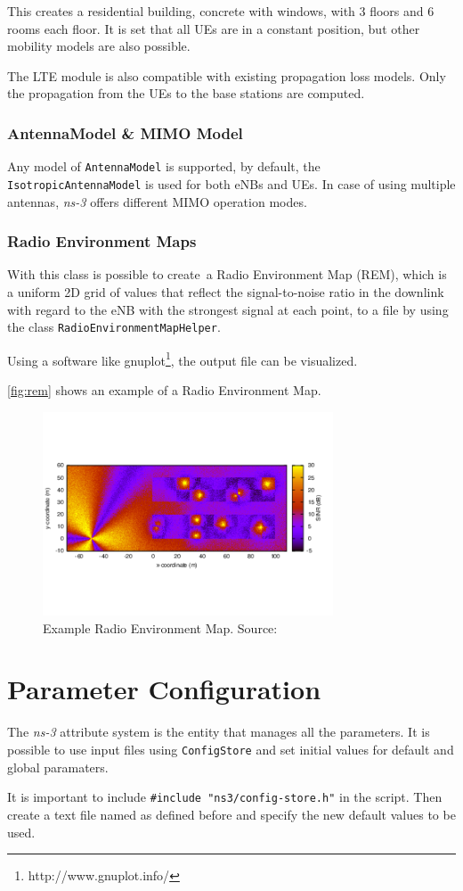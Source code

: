 This creates a residential building, concrete with windows, with 
3 floors and 6 rooms each floor. It is set that all UEs are in a 
constant position, but other mobility models are also possible.

The LTE module is also compatible with existing propagation loss models.
Only the propagation from the UEs to the base stations are computed.

\subsubsection{AntennaModel \& MIMO Model}
Any model of \texttt{AntennaModel} is supported, by default, the \texttt{IsotropicAntennaModel} is
used for both eNBs and UEs. In case of using multiple antennas, \textit{ns-3} offers different MIMO operation 
modes.

\subsubsection{Radio Environment Maps}

With this class is possible to create a Radio Environment Map (REM), 
which is a uniform 2D grid of values that reflect the signal-to-noise ratio in the
downlink with regard to the eNB with the strongest signal at each point, to a file by 
using the class \texttt{RadioEnvironmentMapHelper}.

Using a software like gnuplot\footnote{http://www.gnuplot.info/}, the output file can be visualized.

\autoref{fig:rem} shows an example of a Radio Environment Map.

\begin{figure}[h]
  \centering
  \includegraphics[width=0.77\textwidth]{img/rem.png}
  \caption{Example Radio Environment Map. Source:\cite{ns3} }
  \label{fig:rem}
\end{figure}

\section{Parameter Configuration}
The \textit{ns-3} attribute system is the entity that manages all the parameters. It is 
possible to use input files using \texttt{ConfigStore} and set initial values for default 
and global paramaters.

It is important to include \texttt{\#include "ns3/config-store.h"} in the script. Then create
a text file named as defined before and specify the new default values to be used.